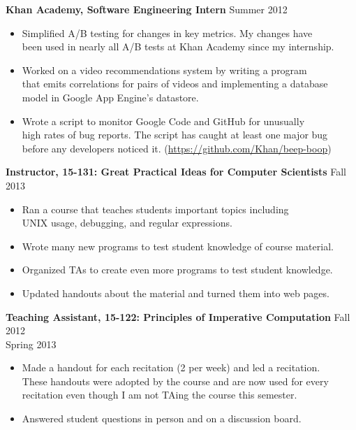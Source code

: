 \documentclass[margin]{res}
\begin{document}
\begin{resume}
  \textbf{Khan Academy, Software Engineering Intern} \hfill Summer 2012
  \begin{itemize} \itemsep -2pt %
  \item Simplified A/B testing for changes in key metrics. My changes have \\
    been used in nearly all A/B tests at Khan Academy since my internship.
  \item Worked on a video recommendations system by writing a program \\
    that emits correlations for pairs of videos and implementing a database \\
    model in Google App Engine's datastore.
  \item Wrote a script to monitor Google Code and GitHub for unusually\\
    high rates of bug reports. The script has caught at least one major bug\\
    before any developers noticed it.  (\href{https://github.com/Khan/beep-boop}
                                            {https://github.com/Khan/beep-boop})
  \end{itemize}

  \textbf{Instructor, 15-131: Great Practical Ideas for Computer Scientists}
    \hfill Fall 2013
  \begin{itemize} \itemsep -2pt
    \item Ran a course that teaches students important topics including\\
      UNIX usage, debugging, and regular expressions.
    \item Wrote many new programs to test student knowledge of course material.
    \item Organized TAs to create even more programs to test student knowledge.
    \item Updated handouts about the material and turned them into web pages.
  \end{itemize}

  \textbf{Teaching Assistant, 15-122: Principles of Imperative Computation}
    \hfill Fall 2012\\ \hphantom{1em} \hfill Spring 2013

  \vspace{-1em}\vspace{-1ex}
  \begin{itemize} \itemsep -2pt
    \item Made a handout for each recitation (2 per week) and led a recitation. \\
      These handouts were adopted by the course and are now used for every \\
      recitation even though I am not TAing the course this semester.
    \item Answered student questions in person and on a discussion board.
  \end{itemize}


\end{resume}
\end{document}
